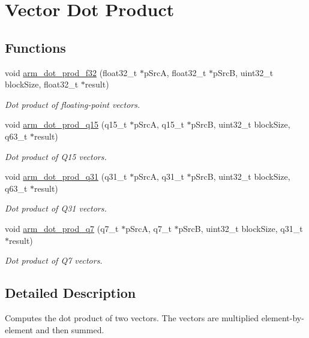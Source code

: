 \hypertarget{group__dot__prod}{}\section{Vector Dot Product}
\label{group__dot__prod}
\subsection*{Functions}
\begin{DoxyCompactItemize}
\item 
void \hyperlink{group__dot__prod_ga55418d4362f6ba84c327f9b4f089a8c3}{arm\+\_\+dot\+\_\+prod\+\_\+f32} (float32\+\_\+t $\ast$p\+SrcA, float32\+\_\+t $\ast$p\+SrcB, uint32\+\_\+t block\+Size, float32\+\_\+t $\ast$result)
\begin{DoxyCompactList}\small\item\em Dot product of floating-\/point vectors. \end{DoxyCompactList}\item 
void \hyperlink{group__dot__prod_ga436d5bed28a4b73b24acbde436a3044b}{arm\+\_\+dot\+\_\+prod\+\_\+q15} (q15\+\_\+t $\ast$p\+SrcA, q15\+\_\+t $\ast$p\+SrcB, uint32\+\_\+t block\+Size, q63\+\_\+t $\ast$result)
\begin{DoxyCompactList}\small\item\em Dot product of Q15 vectors. \end{DoxyCompactList}\item 
void \hyperlink{group__dot__prod_gab15d8fa060fc85b4d948d091b7deaa11}{arm\+\_\+dot\+\_\+prod\+\_\+q31} (q31\+\_\+t $\ast$p\+SrcA, q31\+\_\+t $\ast$p\+SrcB, uint32\+\_\+t block\+Size, q63\+\_\+t $\ast$result)
\begin{DoxyCompactList}\small\item\em Dot product of Q31 vectors. \end{DoxyCompactList}\item 
void \hyperlink{group__dot__prod_ga9c3293a50ac7ec8ba928bf8e3aaea6c1}{arm\+\_\+dot\+\_\+prod\+\_\+q7} (q7\+\_\+t $\ast$p\+SrcA, q7\+\_\+t $\ast$p\+SrcB, uint32\+\_\+t block\+Size, q31\+\_\+t $\ast$result)
\begin{DoxyCompactList}\small\item\em Dot product of Q7 vectors. \end{DoxyCompactList}\end{DoxyCompactItemize}


\subsection{Detailed Description}
Computes the dot product of two vectors. The vectors are multiplied element-\/by-\/element and then summed.



